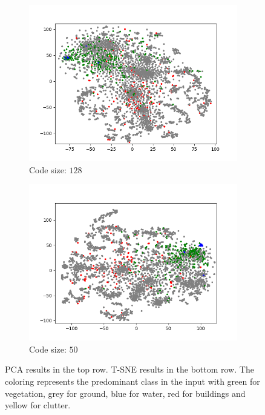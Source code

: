 \begin{figure}[H]
\begin{subfigure}{.25\textwidth}
        \includegraphics[width=\textwidth]{images/figures/experiments_latent/pooling_dim128_classes.png}   
        \caption{Code size: $128$}
    \end{subfigure}%
    \begin{subfigure}{.25\textwidth}
        \centering
        \includegraphics[width=\textwidth]{images/figures/experiments_latent/pooling_dim50_classes.png}
        \caption{Code size: $50$}
    \end{subfigure}
    \caption{ PCA results in the top row. 
    T-SNE results in the bottom row. 
    The coloring represents the predominant class in the input with green for vegetation, 
    grey for ground, blue for water, red for buildings and yellow for clutter.} \label{figure_classes_pooling}
\end{figure} 

